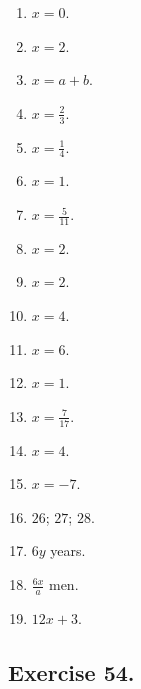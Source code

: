 \documentclass{book}
\begin{document}
\begin{enumerate}
\item $x = 0$.

\item $x = 2$.

\item $x = a + b$.

\item $x = \frac{2}{3}$.

\item $x = \frac{1}{4}$.

\item $x = 1$.

\item $x = \frac{5}{11}$.

\item $x = 2$.

\item $x = 2$.

\item $x = 4$.

\item $x = 6$.

\item $x = 1$.

\item $x = \frac{7}{17}$.

\item $x = 4$.

\item $x = -7$.

\item $26$; $27$; $28$.

\item $6y$ years.

\item $\displaystyle \frac{6x}{a}$ men.

\item $12x + 3$.
\end{enumerate}

\subsection*{Exercise 54.}
\end{document}
